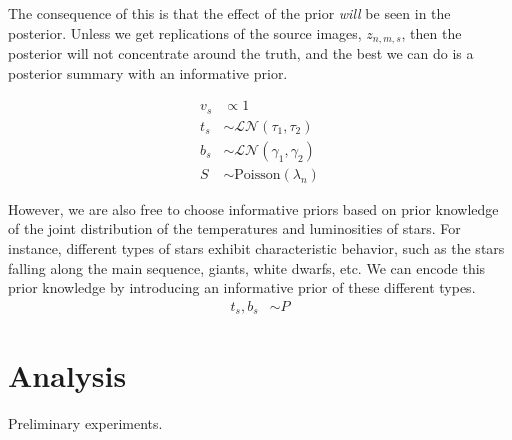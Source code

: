 \documentclass[11pt]{article}
\begin{document}
The consequence of this is that the effect of the prior \emph{will} be seen in the posterior.  Unless we get replications of the source images, $z_{n,m,s}$, then the posterior will not concentrate around the truth, and the best we can do is a posterior summary with an informative prior.  

\begin{align}
  v_s &\propto 1 \\
  t_s &\sim \mathcal{LN}(\tau_1, \tau_2) \\
  b_s &\sim \mathcal{LN}(\gamma_1, \gamma_2) \\
  S   &\sim \textrm{Poisson}(\lambda_n) 
\end{align}


However, we are also free to choose informative priors based on prior knowledge of the joint distribution of the temperatures and luminosities of stars.  For instance, different types of stars exhibit characteristic behavior, such as the stars falling along the main sequence, giants, white dwarfs, etc.  We can encode this prior knowledge by introducing an informative prior of these different types.  
\begin{align}
  t_s, b_s &\sim P
\end{align}


\section{Analysis}

Preliminary experiments.  
\end{document}
